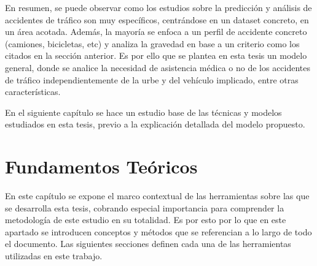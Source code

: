 \documentclass{uathesis-es}
\begin{document}
	
	
	
	
	En resumen, se puede observar como los estudios sobre la predicción y análisis de accidentes de tráfico son muy específicos, centrándose en un dataset concreto, en un área acotada. Además, la mayoría se enfoca a un perfil de accidente concreto (camiones, bicicletas, etc) y analiza la gravedad en base a un criterio como los citados en la sección anterior. Es por ello que se plantea en esta tesis un modelo general, donde se analice la necesidad de asistencia médica o no de los accidentes de tráfico independientemente de la urbe y del vehículo implicado, entre otras características.
	
	En el siguiente capítulo se hace un estudio base de las técnicas y modelos estudiados en esta tesis, previo a la explicación detallada del modelo propuesto.
	
	\chapter{Fundamentos Teóricos}
	
	En este capítulo se expone el marco contextual de las herramientas sobre las que se desarrolla esta tesis, cobrando especial importancia para comprender la metodología de este estudio en su totalidad. Es por esto por lo que en este apartado se introducen conceptos y métodos que se referencian a lo largo de todo el documento. Las siguientes secciones definen cada una de las herramientas utilizadas en este trabajo.
	
	
\end{document}
